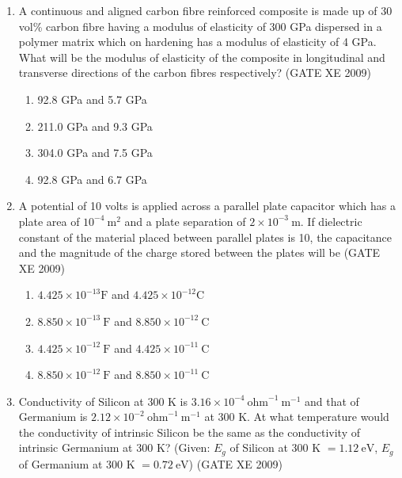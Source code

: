 \documentclass[journal]{IEEEtran}
\begin{document}
\begin{enumerate}
    \item A continuous and aligned carbon fibre reinforced composite is made up of 30 vol\% carbon fibre having a modulus of elasticity of 300 GPa dispersed in a polymer matrix which on hardening has a modulus of elasticity of 4 GPa. What will be the modulus of elasticity of the composite in longitudinal and transverse directions of the carbon fibres respectively? \hfill (GATE XE 2009)

    \begin{multicols}{2}
        \begin{enumerate}
            \item 92.8 GPa and 5.7 GPa
            \item 211.0 GPa and 9.3 GPa
            \item 304.0 GPa and 7.5 GPa
            \item 92.8 GPa and 6.7 GPa
        \end{enumerate}
    \end{multicols}

    \item A potential of 10 volts is applied across a parallel plate capacitor which has a plate area of $10^{-4} \ \text{m}^2$ and a plate separation of $2 \times 10^{-3} \ \text{m}$. If dielectric constant of the material placed between parallel plates is 10, the capacitance and the magnitude of the charge stored between the plates will be \hfill (GATE XE 2009)

    \begin{enumerate}
        \item $4.425 \times 10^{-13} \text{F}$ and $4.425 \times 10^{-12} \text{C}$
        \item $8.850 \times 10^{-13} \ \text{F}$ and $8.850 \times 10^{-12} \ \text{C}$
        \item $4.425 \times 10^{-12} \ \text{F}$ and $4.425 \times 10^{-11} \ \text{C}$
        \item $8.850 \times 10^{-12} \ \text{F}$ and $8.850 \times 10^{-11} \ \text{C}$
    \end{enumerate}

    \item Conductivity of Silicon at 300 K is $3.16 \times 10^{-4} \ \text{ohm}^{-1} \ \text{m}^{-1}$ and that of Germanium is $2.12 \times 10^{-2} \ \text{ohm}^{-1} \ \text{m}^{-1}$ at 300 K. At what temperature would the conductivity of intrinsic Silicon be the same as the conductivity of intrinsic Germanium at 300 K? (Given: $E_g$ of Silicon at 300 K $= 1.12 \ \text{eV}$, $E_g$ of Germanium at 300 K $= 0.72 \ \text{eV}$) \hfill (GATE XE 2009)


\end{enumerate}
\end{document}
